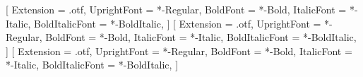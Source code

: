 \usepackage[parfill]{parskip} %
\usepackage[norwegian]{babel} %

\usepackage{emptypage}
\usepackage{subcaption}
\usepackage{multicol}
\usepackage{lipsum} %
\usepackage{graphicx} %
\usepackage{xparse} %
\usepackage{url} %

\usepackage{color}
\usepackage{xcolor} %

\usepackage{fontspec}
\setmainfont{IBMPlexSerif}[
    Extension = .otf,
    UprightFont = *-Regular,
    BoldFont = *-Bold,
    ItalicFont = *-Italic,
    BoldItalicFont = *-BoldItalic,
]
\setsansfont{IBMPlexSans}[
    Extension = .otf,
    UprightFont = *-Regular,
    BoldFont = *-Bold,
    ItalicFont = *-Italic,
    BoldItalicFont = *-BoldItalic,
]
\setmonofont{IBMPlexMono}[
    Extension = .otf,
    UprightFont = *-Regular,
    BoldFont = *-Bold,
    ItalicFont = *-Italic,
    BoldItalicFont = *-BoldItalic,
]

\usepackage{amsmath, amsfonts, mathtools, amsthm, amssymb, array}
\usepackage{mathrsfs}
\usepackage{cancel} %
\usepackage{bm} %
\usepackage{systeme} %
\usepackage{polynom}
\newcommand{\polynomdiv}[2]{\par\polylongdiv[style=C,div=:]{#1}{#2}\par}
\setlength{\parindent}{0pt}
\newcommand\N{\ensuremath{\mathbb{N}}}
\newcommand\R{\ensuremath{\mathbb{R}}}
\newcommand\Z{\ensuremath{\mathbb{Z}}}
\renewcommand\O{\ensuremath{\emptyset}}
\newcommand\Q{\ensuremath{\mathbb{Q}}}
\newcommand\C{\ensuremath{\mathbb{C}}}
\let\implies\Rightarrow
\let\impliedby\Leftarrow
\let\iff\Leftrightarrow

\usepackage{booktabs} %
\usepackage{colortbl}
\newcommand{\gray}{\rowcolor[gray]{.9}} %

\usepackage{siunitx}
\usepackage{tikz} %
\usetikzlibrary{calc, angles, quotes, arrows}
\usepackage[siunitx]{circuitikz} %

\newcommand\hr{
    \vspace{3mm}
    \noindent\hrule
}

